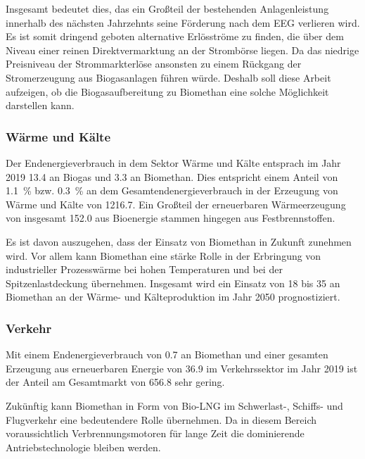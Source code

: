 Insgesamt bedeutet dies, das ein Großteil der bestehenden Anlagenleistung innerhalb des nächsten Jahrzehnts seine Förderung nach dem \gls{EEG} verlieren wird. Es ist somit dringend geboten alternative Erlösströme zu finden, die über dem Niveau einer reinen Direktvermarktung an der Strombörse liegen. Da das niedrige Preisniveau der Strommarkterlöse ansonsten zu einem Rückgang der Stromerzeugung aus Biogasanlagen führen würde. Deshalb soll diese Arbeit aufzeigen, ob die Biogasaufbereitung zu Biomethan eine solche Möglichkeit darstellen kann.


\subsubsection{Wärme und Kälte}

Der Endenergieverbrauch in dem Sektor Wärme und Kälte entsprach im Jahr 2019 \SI{13.4}{\twh} an Biogas und \SI{3.3}{\twh} an Biomethan. Dies entspricht einem Anteil von \SI{1.1}{\percent} bzw. \SI{0.3}{\percent} an dem Gesamtendenergieverbrauch in der Erzeugung von Wärme und Kälte von \SI{1216.7}{\twh}. Ein Großteil der erneuerbaren Wärmeerzeugung von insgesamt \SI{152.0}{\twh} aus Bioenergie stammen hingegen aus Festbrennstoffen. \parencite{BWE2020}\smallskip

Es ist davon auszugehen, dass der Einsatz von Biomethan in Zukunft zunehmen wird. Vor allem kann Biomethan eine stärke Rolle in der Erbringung von industrieller Prozesswärme bei hohen Temperaturen und bei der Spitzenlastdeckung übernehmen. Insgesamt wird ein Einsatz von \SI{18}{\twh} bis \SI{35}{\twh} an Biomethan an der Wärme- und Kälteproduktion im Jahr 2050 prognostiziert. \parencite{dena2017}

\subsubsection{Verkehr}

Mit einem Endenergieverbrauch von \SI{0.7}{\twh} an Biomethan und einer gesamten Erzeugung aus erneuerbaren Energie von \SI{36.9}{\twh} im Verkehrssektor im Jahr 2019 ist der Anteil am Gesamtmarkt von \SI{656.8}{\twh} sehr gering. \parencite{BWE2020} \smallskip

Zukünftig kann Biomethan in Form von Bio-\gls{LNG} im \mbox{Schwerlast-,} Schiffs- und Flugverkehr eine bedeutendere Rolle übernehmen. Da in diesem Bereich voraussichtlich Verbrennungsmotoren für lange Zeit die dominierende Antriebstechnologie bleiben werden. \parencite{dena2017}